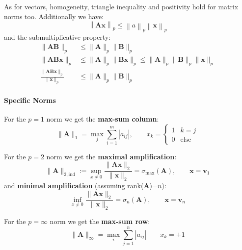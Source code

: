 \newpar{}

As for vectors, homogeneity, triangle inequality and positivity hold for matrix norms too. Additionally we have:
\begin{equation*}
    \left\|\mathbf{Ax}\right\|_p\leq\left\|a\right\|_p\left\|\mathbf{x}\right\|_p
\end{equation*}
and the submultiplicative property:
\begin{align*}
    \|\mathbf{AB}\|_p                                     & \leq\|\mathbf{A}\|_p\|\mathbf{B}\|_p                                                      \\
    \|\mathbf{AB} \mathbf{x}\|_p                          & \leq\|\mathbf{A}\|_p\|\mathbf{Bx}\|_p\leq\|\mathbf{A}\|_p\|\mathbf{B}\|_p\|\mathbf{x}\|_p \\
    \frac{\|\mathbf{AB} \mathbf{x}\|_p}{\|\mathbf{x}\|_p} & \leq\|\mathbf{A}\|_p\|\mathbf{B}\|_p
\end{align*}


\paragraph{Specific Norms}


For the $p = 1$ norm we get the \textbf{max-sum column}:
\begin{equation*}
    \|\mathbf{A}\|_1=\max_j\sum_{i=1}^m|a_{ij}|,\qquad x_k=\begin{cases}
        1 & k=j         \\
        0 & \text{else}
    \end{cases}
\end{equation*}

\newpar{}
For the $p = 2$ norm we get the \textbf{maximal amplification}:
\noindent\begin{equation*}
    \|\mathbf{A}\|_{2,\mathrm{ind}}:=\sup_{x\neq0}\frac{\|\mathbf{Ax}\|_2}{\|\mathbf{x}\|_2}=\sigma_{\max}(\mathbf{A}),\qquad \mathbf{x}=\mathbf{v}_1
\end{equation*}
and \textbf{minimal amplification} (assuming rank($\mathbf{A}$)=$n$):
\noindent\begin{equation*}
    \inf_{x\neq0}\frac{\|\mathbf{Ax}\|_2}{\|\mathbf{x}\|_2}=\sigma_n(\mathbf{A}),\qquad \mathbf{x}=\mathbf{v}_n
\end{equation*}

\newpar{}
For the $p = \infty$ norm we get the \textbf{max-sum row}:
\begin{equation*}
    \|\mathbf{A}\|_\infty=\max_i\sum_{j=1}^n|a_{ij}|\qquad x_k=\pm 1
\end{equation*}


